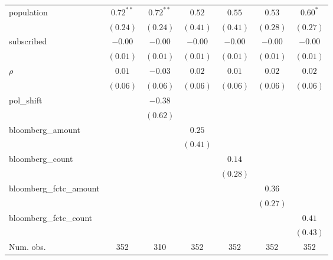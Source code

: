 \begin{table}[!h]
\begin{center}
\begin{tabular}{l c c c c c c }
population              & $0.72^{**}$  & $0.72^{**}$  & $0.52$       & $0.55$       & $0.53$       & $0.60^{*}$   \\
                        & $(0.24)$     & $(0.24)$     & $(0.41)$     & $(0.41)$     & $(0.28)$     & $(0.27)$     \\
subscribed              & $-0.00$      & $-0.00$      & $-0.00$      & $-0.00$      & $-0.00$      & $-0.00$      \\
                        & $(0.01)$     & $(0.01)$     & $(0.01)$     & $(0.01)$     & $(0.01)$     & $(0.01)$     \\
$\rho$                  & $0.01$       & $-0.03$      & $0.02$       & $0.01$       & $0.02$       & $0.02$       \\
                        & $(0.06)$     & $(0.06)$     & $(0.06)$     & $(0.06)$     & $(0.06)$     & $(0.06)$     \\
pol\_shift              &              & $-0.38$      &              &              &              &              \\
                        &              & $(0.62)$     &              &              &              &              \\
bloomberg\_amount       &              &              & $0.25$       &              &              &              \\
                        &              &              & $(0.41)$     &              &              &              \\
bloomberg\_count        &              &              &              & $0.14$       &              &              \\
                        &              &              &              & $(0.28)$     &              &              \\
bloomberg\_fctc\_amount &              &              &              &              & $0.36$       &              \\
                        &              &              &              &              & $(0.27)$     &              \\
bloomberg\_fctc\_count  &              &              &              &              &              & $0.41$       \\
                        &              &              &              &              &              & $(0.43)$     \\
\midrule
Num. obs.               & 352          & 310          & 352          & 352          & 352          & 352          \\

\end{tabular}
\end{center}
\end{table}
